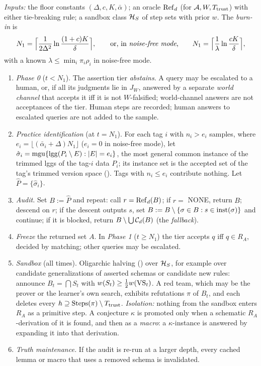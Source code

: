 \begin{definition}\label{def:twotier:ttl}
\emph{Inputs:} the floor constants $(\Delta,c,K,\bar\alpha)$; an oracle $\mathrm{Ref}_d$ (for $\mathcal{A},W,T_{\mathrm{trust}}$) with either tie-breaking rule; a sandbox class $\mathcal{H}_S$ of step sets with prior $w$. The \emph{burn-in} is
\[
N_1=\Bigl\lceil\frac1{2\Delta^2}\ln\frac{(1+c)K}{\delta}\Bigr\rceil,\qquad\text{or, in \emph{noise-free mode},}\qquad N_1=\Bigl\lceil\frac1\lambda\ln\frac{cK}{\delta}\Bigr\rceil,
\]
with a known $\lambda\le\min_i\pi_i\rho_i$ in noise-free mode.
\begin{enumerate}[label=\textbf{\arabic*.},leftmargin=*,start=0]
\item \emph{Phase 0} ($t<N_1$). The assertion tier \emph{abstains}. A query may be escalated to a human, or, if all its judgments lie in $J_W$, answered by a separate \emph{world channel} that accepts it iff it is not $W$-falsified; world-channel answers are not acceptances of the tier. Human steps are recorded; human answers to escalated queries are not added to the sample.
\item \emph{Practice identification} (at $t=N_1$). For each tag $i$ with $n_i>e_i$ samples, where $e_i=\lfloor(\bar\alpha_i+\Delta)N_1\rfloor$ ($e_i=0$ in noise-free mode), let $\hat\sigma_i=\mathrm{mgu}\{\mathrm{lgg}(P_i\setminus E):|E|=e_i\}$, the most general common instance of the trimmed lggs of the tag-$i$ data $P_i$; its instance set is the accepted set of the tag's trimmed version space (). Tags with $n_i\le e_i$ contribute nothing. Let $\hat P=\{\hat\sigma_i\}$.
\item \emph{Audit.} Set $B:=\hat P$ and repeat: call $r=\mathrm{Ref}_d(B)$; if $r=$ NONE, return $B$; descend on $r$; if the descent outputs $s$, set $B:=B\setminus\{\sigma\in B:s\in\mathrm{inst}(\sigma)\}$ and continue; if it is blocked, return $B\setminus\bigcup\mathcal{C}_d(B)$ (the \emph{fallback}).
\item \emph{Freeze} the returned set $A$. In \emph{Phase 1} ($t\ge N_1$) the tier accepts $q$ iff $q\in R_A$, decided by matching; other queries may be escalated.
\item \emph{Sandbox} (all times). Oligarchic halving () over $\mathcal{H}_S$, for example over candidate generalizations of asserted schemas or candidate new rules: announce $B_t=\bigcap S_t$ with $w(S_t)\ge\frac12w(\mathrm{VS}_t)$. A red team, which may be the prover or the learner's own search, exhibits refutations $\pi$ of $B_t$, and each deletes every $h\supseteq\mathrm{Steps}(\pi)\setminus T_{\mathrm{trust}}$. \emph{Isolation:} nothing from the sandbox enters $R_A$ as a primitive step. A conjecture $\kappa$ is promoted only when a schematic $R_A$-derivation of it is found, and then as a \emph{macro}: a $\kappa$-instance is answered by expanding it into that derivation.
\item \emph{Truth maintenance.} If the audit is re-run at a larger depth, every cached lemma or macro that uses a removed schema is invalidated.
\end{enumerate}
\end{definition}

